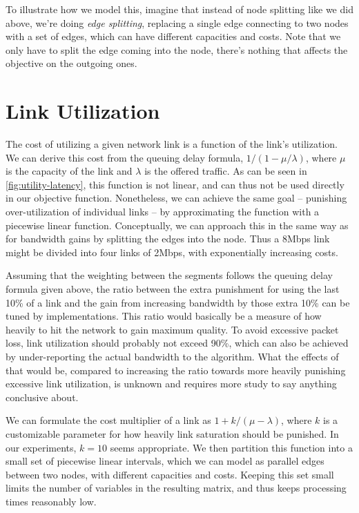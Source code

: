 To illustrate how we model this, imagine that instead of node splitting like we did above, we're doing \emph{edge splitting}, replacing a single edge connecting to two nodes with a set of edges, which can have different capacities and costs. Note that we only have to split the edge coming into the node, there's nothing that affects the objective on the outgoing ones.


\section{Link Utilization}

The cost of utilizing a given network link is a function of the link's utilization. We can derive this cost from the queuing delay formula, $1/(1 - \mu/\lambda)$, where $\mu$ is the capacity of the link and $\lambda$ is the offered traffic. As can be seen in \autoref{fig:utility-latency}, this function is not linear, and can thus not be used directly in our objective function. Nonetheless, we can achieve the same goal -- punishing over-utilization of individual links -- by approximating the function with a piecewise linear function. Conceptually, we can approach this in the same way as for bandwidth gains by splitting the edges into the node. Thus a 8Mbps link might be divided into four links of 2Mbps, with exponentially increasing costs.

Assuming that the weighting between the segments follows the queuing delay formula given above, the ratio between the extra punishment for using the last 10\% of a link and the gain from increasing bandwidth by those extra 10\% can be tuned by implementations. This ratio would basically be a measure of how heavily to hit the network to gain maximum quality. To avoid excessive packet loss, link utilization should probably not exceed 90\%, which can also be achieved by under-reporting the actual bandwidth to the algorithm. What the effects of that would be, compared to increasing the ratio towards more heavily punishing excessive link utilization, is unknown and requires more study to say anything conclusive about.

We can formulate the cost multiplier of a link as $1 + k/(\mu - \lambda)$, where $k$ is a customizable parameter for how heavily link saturation should be punished. In our experiments, $k=10$ seems appropriate. We then partition this function into a small set of piecewise linear intervals, which we can model as parallel edges between two nodes, with different capacities and costs. Keeping this set small limits the number of variables in the resulting matrix, and thus keeps processing times reasonably low.

